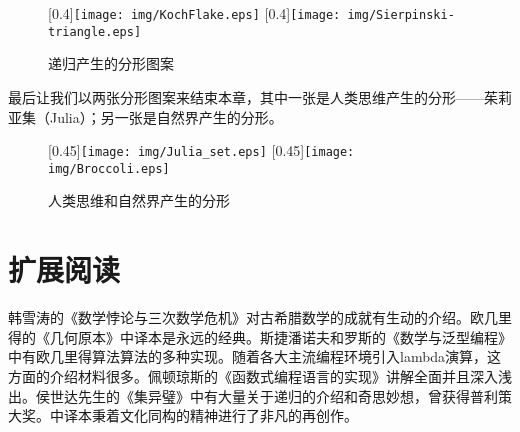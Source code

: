 \documentclass{article}
\begin{document}
\begin{figure}[htbp]
 \centering
 [0.4\linewidth]{\texttt{[image: img/KochFlake.eps]}}
 [0.4\linewidth]{\texttt{[image: img/Sierpinski-triangle.eps]}}
 \caption{递归产生的分形图案}
 \label{fig:fractal}
\end{figure}

最后让我们以两张分形图案来结束本章，其中一张是人类思维产生的分形——茱莉亚集（Julia）；另一张是自然界产生的分形。

\begin{figure}[htbp]
 \centering
 [0.45\linewidth]{\texttt{[image: img/Julia\_set.eps]}}
 [0.45\linewidth]{\texttt{[image: img/Broccoli.eps]}}
 \caption{人类思维和自然界产生的分形}
 \label{fig:more-fractal}
\end{figure}

\section{扩展阅读}

韩雪涛的《数学悖论与三次数学危机》\cite{HanXueTao16}对古希腊数学的成就有生动的介绍。欧几里得的《几何原本》中译本\cite{Elements}是永远的经典。斯捷潘诺夫和罗斯的《数学与泛型编程》\cite{StepanovRose15}中有欧几里得算法算法的多种实现。随着各大主流编程环境引入lambda演算，这方面的介绍材料很多。佩顿琼斯的《函数式编程语言的实现》\cite{SPJ1987}讲解全面并且深入浅出。侯世达先生的《集异璧》\cite{GEB}中有大量关于递归的介绍和奇思妙想，曾获得普利策大奖。中译本秉着文化同构的精神进行了非凡的再创作。
\end{document}

